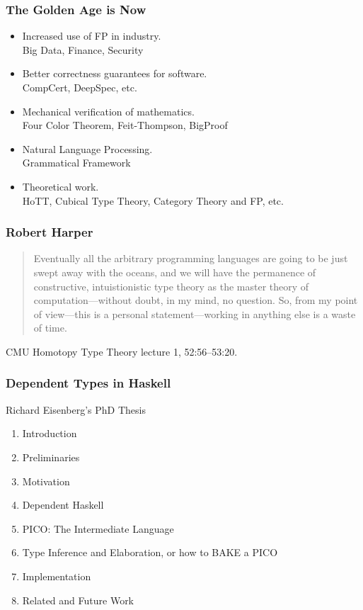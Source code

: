 \documentclass{beamer}
\begin{document}
\begin{frame}\frametitle{The Golden Age is Now}
\begin{itemize}
\item Increased use of FP in industry.\\
  Big Data, Finance, Security
\item Better correctness guarantees for software.\\
  CompCert, DeepSpec, etc.
\item Mechanical verification of mathematics.\\
  Four Color Theorem, Feit-Thompson, BigProof
\item Natural Language Processing.\\
  Grammatical Framework
\item Theoretical work.\\
  HoTT, Cubical Type Theory, Category Theory and FP, etc.
\end{itemize}
\end{frame}

\begin{frame}\frametitle{Robert Harper}
\begin{quote}
Eventually all the arbitrary programming languages are going to be just swept away with the oceans,
and we will have the permanence of constructive, intuistionistic type theory as the master theory
of computation---without doubt, in my mind, no question.  So, from my point of view---this is a personal
statement---working in anything else is a waste of time.
\end{quote}

CMU Homotopy Type Theory lecture 1, 52:56--53:20.
\end{frame}

\begin{frame}\frametitle{Dependent Types in Haskell}
Richard Eisenberg's PhD Thesis  
\begin{enumerate}
\item Introduction
\item Preliminaries
\item Motivation
\item Dependent Haskell
\item PICO: The Intermediate Language
\item Type Inference and Elaboration, or how to BAKE a PICO
\item Implementation
\item Related and Future Work
\end{enumerate}
\end{frame}
\end{document}
